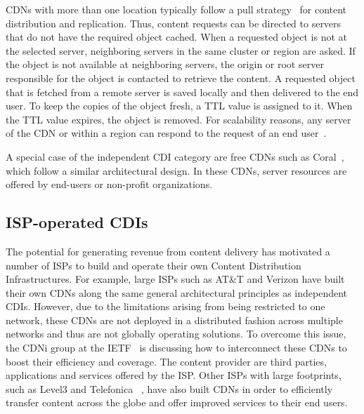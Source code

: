\vspace{0.5em} CDNs with more than one location typically follow a pull
strategy~\cite{Akamai-Network} for content distribution and replication. Thus,
content requests can be directed to servers that do not have the required
object cached.  When a requested object is not at the selected server,
neighboring servers in the same cluster or region are asked. If the object is
not available at neighboring servers, the origin or root server responsible for
the object is contacted to retrieve the content. A requested object that is
fetched from a remote server is saved locally and then delivered to the end
user. To keep the copies of the object fresh, a TTL value is assigned to it.
When the TTL value expires, the object is removed. For scalability reasons, any
server of the CDN or within a region can respond to the request of an end
user~\cite{CDNsec2009}.

A special case of the independent CDI category are free CDNs such as
Coral~\cite{CoralCDN}, which follow a similar architectural design. In these
CDNs, server resources are offered by end-users or non-profit organizations.

\subsection{ISP-operated CDIs} The potential for generating revenue from
content delivery has motivated a number of ISPs to build and operate their own
Content Distribution Infrastructures. For example, large ISPs such as AT\&T and
Verizon have built their own CDNs along the same general architectural
principles as independent CDIs. However, due to the limitations arising from
being restricted to one network, these CDNs are not deployed in a distributed
fashion across multiple networks and thus are not globally operating solutions.
To overcome this issue, the CDNi group at the IETF~\cite {CDNi} is discussing
how to interconnect these CDNs to boost their efficiency and coverage. The
content provider are third parties, applications and services offered by the
ISP. Other ISPs with large footprints, such as Level3 and Telefonica~ \cite
{interdatacenter,ToN-DTB}, have also built CDNs in order to efficiently
transfer content across the globe and offer improved services to their end
users.

